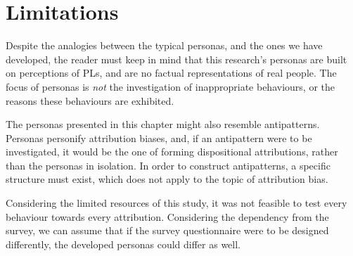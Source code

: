 \section{Limitations}

Despite the analogies between the typical personas, and the ones we have developed, the reader must keep in mind that this research's personas are built on perceptions of PLs, and are no factual representations of real people. The focus of personas is \textit{not} the investigation of inappropriate behaviours, or the reasons these behaviours are exhibited. 

The personas presented in this chapter might also resemble antipatterns. Personas personify attribution biases, and, if an antipattern were to be investigated, it would be the one of forming dispositional attributions, rather than the personas in isolation. In order to construct antipatterns, a specific structure must exist, which does not apply to the topic of attribution bias.

Considering the limited resources of this study, it was not feasible to test every behaviour towards every attribution. Considering the dependency from the survey, we can assume that if the survey questionnaire were to be designed differently, the developed personas could differ as well.
